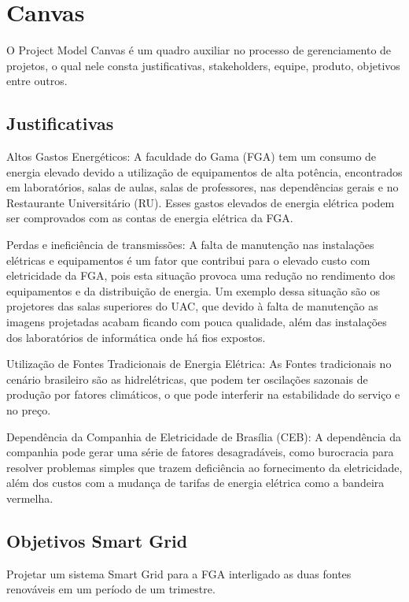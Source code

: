 \newpage

\section{Canvas}
O Project Model Canvas é um quadro auxiliar no processo de gerenciamento de projetos, o qual nele consta justificativas, stakeholders, equipe, produto, objetivos entre outros. 

\subsection{Justificativas}
\par Altos Gastos Energéticos: A faculdade do Gama (FGA) tem um consumo de energia elevado devido a utilização de equipamentos de alta potência, encontrados em laboratórios, salas de aulas, salas de professores, nas dependências gerais e no Restaurante Universitário (RU). Esses gastos elevados de energia elétrica podem ser comprovados com as contas de energia elétrica da FGA.
\par Perdas e ineficiência de transmissões: A falta de manutenção nas instalações elétricas e equipamentos é um fator que contribui para o elevado custo com eletricidade da FGA, pois esta situação provoca uma redução no rendimento dos equipamentos e da distribuição de energia. Um exemplo dessa situação são os projetores das salas superiores do UAC, que devido à falta de manutenção as imagens projetadas acabam ficando com pouca qualidade, além das instalações dos laboratórios de informática onde há fios expostos.
\par Utilização de Fontes Tradicionais de Energia Elétrica: As Fontes tradicionais no cenário brasileiro são as hidrelétricas, que podem ter oscilações sazonais de produção por fatores climáticos, o que pode interferir na estabilidade do serviço e no preço.
\par Dependência da Companhia de Eletricidade de Brasília (CEB): A dependência da companhia pode gerar uma série de fatores desagradáveis, como burocracia para resolver problemas simples que trazem deficiência ao fornecimento da eletricidade, além dos custos com a mudança de tarifas de energia elétrica como a bandeira vermelha.

\subsection{Objetivos Smart Grid}
Projetar um sistema Smart Grid para a FGA interligado as duas fontes renováveis em um período de um trimestre.

